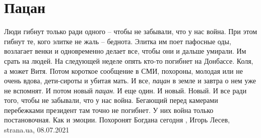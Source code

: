  
 
 
 
 
\chapter{Пацан}
\label{sec:slova.pacan}

Люди гибнут только ради одного – чтобы не забывали, что у нас война. При этом
гибнут те, кого элитке не жаль – беднота. Элитка им поет пафосные оды,
возлагает венки и одновременно делает все, чтобы они и дальше умирали.  Им
срать на людей. На следующей неделе опять кто-то погибнет на Донбассе. Коля, а
может Витя. Потом короткое сообщение в СМИ, похороны, молодая или не очень
вдова, дети-сироты и убитая мать. И все, \emph{пацан} в земле и завтра о нем
уже не вспомнят. И потом новый \emph{пацан}. И еще один. И новый. Новый. И все
ради того, чтобы не забывали, что у нас война.  Бегающий перед камерами
перебежками президент там точно не погибнет. У них война только постановочная.
Как и эмоции.  Похоронят Богдана сегодня
, 
Игорь Лесев, strana.ua, 08.07.2021
